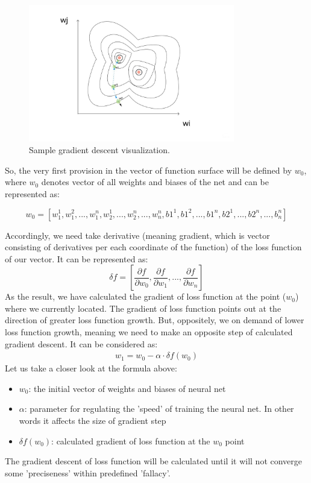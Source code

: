 \begin{figure}[h]
    \centering \includegraphics[width=9cm]{images/gradient_descent.jpg}
    \caption {Sample gradient descent visualization.}
\end{figure}

So, the very first provision in the vector of function surface will be defined by $w_0$, where $w_0$ denotes vector of all weights and biases of the net and can be represented as: 

\[ w_0 = [w_1^1, w_1^2,...,w_1^n, w_2^1,...,w_2^n,...,w_n^n, b1^1, b1^2,...,b1^n, b2^1,...,b2^n,...,b_n^n] \]

Accordingly, we need take derivative (meaning gradient, which is vector consisting of derivatives per each coordinate of the function) of the loss function of our vector. It can be represented as:
\[ \delta{f} = [\frac{\partial{f}}{\partial{w_0}}, \frac{\partial{f}}{\partial{w_1}}, ... ,\frac{\partial{f}}{\partial{w_n}} ] \]
As the result, we have calculated the gradient of loss function at the point ($w_0$) where we currently located. The gradient of loss function points out at the direction of greater loss function growth. But, oppositely, we on demand of lower loss function growth, meaning we need to make an opposite step of calculated gradient descent. It can be considered as:
\begin{align*}
w_1 = w_0 - \alpha \cdot \delta{f(w_0)}
\end{align*}
Let us take a closer look at the formula above:
\begin{itemize}
    \item $w_0$: the initial vector of weights and biases of neural net
    \item $\alpha$: parameter for regulating the 'speed' of training the neural net. In other words it affects the size of gradient step 
    \item $\delta{f(w_0)}$: calculated gradient of loss function at the $w_0$ point 
\end{itemize}
The gradient descent of loss function will be calculated until it will not converge some 'preciseness' within predefined 'fallacy'.



